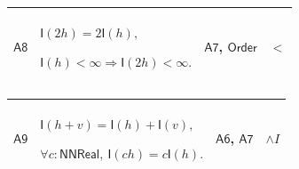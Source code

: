 \documentclass[11pt]{amsart}
\newlength{\FTCFourColumnBody}
\begin{document}
{\begin{tabular}
\end{tabular}%
\par\setlength{\parskip}{0pt}\nointerlineskip
\noindent
\begin{tabular}{|@{}>{\centering\arraybackslash}m{0.078431\FTCFourColumnBody}|>{\centering\arraybackslash}m{0.535947\FTCFourColumnBody}|>{\centering\arraybackslash}m{0.281045\FTCFourColumnBody}|>{\centering\arraybackslash}m{0.104575\FTCFourColumnBody}|}\hline
\hypertarget{dct:A8}{$\displaystyle \textsf{A8}$} & $\displaystyle \textsf{I}(2h)=2\textsf{I}(h),$\par
$\displaystyle \textsf{I}(h)<\infty\Rightarrow\textsf{I}(2h)<\infty.$ & \hyperlink{dct:A7}{$\displaystyle \textsf{A7}$}, \hyperlink{ax:Order}{$\displaystyle \textsf{Order}$} & $\displaystyle <$\\ \hline
\end{tabular}%
\par\setlength{\parskip}{0pt}\nointerlineskip
\noindent
\begin{tabular}{|@{}>{\centering\arraybackslash}m{0.078431\FTCFourColumnBody}|>{\centering\arraybackslash}m{0.535947\FTCFourColumnBody}|>{\centering\arraybackslash}m{0.281045\FTCFourColumnBody}|>{\centering\arraybackslash}m{0.104575\FTCFourColumnBody}|}\hline
\hypertarget{dct:A9}{$\displaystyle \textsf{A9}$} & $\displaystyle \textsf{I}(h+v)=\textsf{I}(h)+\textsf{I}(v),$\par
$\displaystyle \forall c:\textsf{NNReal},\ \textsf{I}(ch)=c\textsf{I}(h).$ & \hyperlink{dct:A6}{$\displaystyle \textsf{A6}$}, \hyperlink{dct:A7}{$\displaystyle \textsf{A7}$} & $\displaystyle \land I$\\ \hline
\end{tabular}%
\par
}
\end{document}
